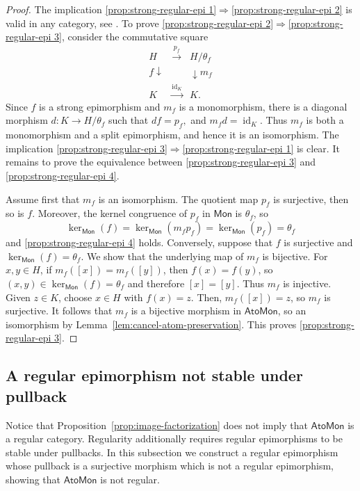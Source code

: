 \documentclass[a4paper,10pt,reqno]{amsart}
\theoremstyle{definition}
\theoremstyle{remark}
\newcommand{\AtoMon}{\mathsf{AtoMon}}
\newcommand{\Mon}{\mathsf{Mon}}
\newcommand{\id}{\operatorname{id}}
\begin{document}
\begin{proof}
The implication \ref{prop:strong-regular-epi 1}$\Rightarrow$\ref{prop:strong-regular-epi 2} is valid in any category, see \cite[Proposition 1.8]{Gran}. To prove \ref{prop:strong-regular-epi 2}$\Rightarrow$\ref{prop:strong-regular-epi 3}, consider the commutative square
$$
\begin{matrix}
H&\xrightarrow{p_f}&H/\theta_f\\
{\scriptstyle f}\downarrow&&\downarrow{\scriptstyle m_f}\\
K&\xrightarrow{\id_K}&K.
\end{matrix}
$$
Since $f$ is a strong epimorphism and $m_f$ is a monomorphism, there is
a diagonal morphism $d:K\to H/\theta_f$ such that $ df=p_f,$ and $m_fd=\id_K.$ Thus $m_f$ is both a monomorphism and a split epimorphism, and hence it is an isomorphism. The implication \ref{prop:strong-regular-epi 3}$\Rightarrow$\ref{prop:strong-regular-epi 1} is clear. It remains to prove the equivalence between \ref{prop:strong-regular-epi 3} and
\ref{prop:strong-regular-epi 4}. 

Assume first that $m_f$ is an isomorphism. The quotient map $p_f$ is surjective, then so is $f$. Moreover, the kernel congruence of $p_f$ in $\Mon$ is $\theta_f$, so
$$
 \ker_{\Mon}(f)
 =\ker_{\Mon}(m_fp_f)
 =\ker_{\Mon}(p_f)
 =\theta_f
$$
and \ref{prop:strong-regular-epi 4} holds. Conversely, suppose that $f$ is surjective and
$\ker_{\Mon}(f)=\theta_f$.  We show that the underlying map of $m_f$ is
bijective. For $x,y\in H$, if $m_f([x])=m_f([y])$,
then $f(x)=f(y)$, so $(x,y)\in\ker_{\Mon}(f)=\theta_f$ and therefore $[x]=[y]$. Thus $m_f$ is injective. Given $z\in K$, choose $x\in H$
with $f(x)=z$. Then, $m_f([x])=z$, so $m_f$ is surjective. It follows that $m_f$ is a bijective morphism in $\AtoMon$, so an
isomorphism by Lemma~\ref{lem:cancel-atom-preservation}. This proves \ref{prop:strong-regular-epi 3}.
\end{proof}

\subsection{A regular epimorphism not stable under pullback}\label{subsec:regepi_notstable}

Notice that Proposition~\ref{prop:image-factorization} does not imply that $\AtoMon$ is a regular category. Regularity additionally requires regular epimorphisms to be stable under pullbacks. In this subsection we construct a regular epimorphism whose pullback is a surjective morphism which is not a regular epimorphism, showing that $\AtoMon$ is not regular.
\end{document}
